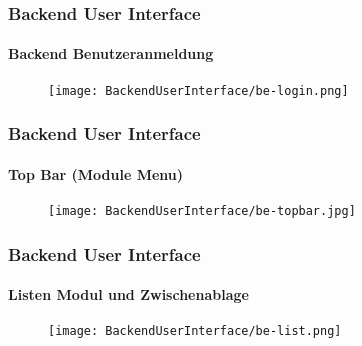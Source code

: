 \begin{frame}[fragile]
	\frametitle{Backend User Interface}
	\framesubtitle{Backend Benutzeranmeldung}

	\begin{figure}
		\texttt{[image: BackendUserInterface/be-login.png]}
	\end{figure}

\end{frame}


\begin{frame}[fragile]
	\frametitle{Backend User Interface}
	\framesubtitle{Top Bar (Module Menu)}

	\begin{figure}
		\texttt{[image: BackendUserInterface/be-topbar.jpg]}
	\end{figure}

\end{frame}


\begin{frame}[fragile]
	\frametitle{Backend User Interface}
	\framesubtitle{Listen Modul und Zwischenablage}

	\begin{figure}
		\texttt{[image: BackendUserInterface/be-list.png]}
	\end{figure}

\end{frame}


